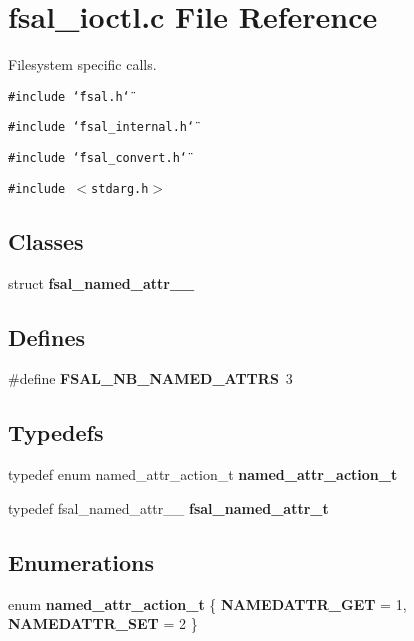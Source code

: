 \section{fsal\_\-ioctl.c File Reference}
\label{fsal__ioctl_8c}
Filesystem specific calls. 

{\tt \#include \char`\"{}fsal.h\char`\"{}}\par
{\tt \#include \char`\"{}fsal\_\-internal.h\char`\"{}}\par
{\tt \#include \char`\"{}fsal\_\-convert.h\char`\"{}}\par
{\tt \#include $<$stdarg.h$>$}\par
\subsection*{Classes}
\begin{CompactItemize}
\item 
struct {\bf fsal\_\-named\_\-attr\_\-\_\-}
\end{CompactItemize}
\subsection*{Defines}
\begin{CompactItemize}
\item 
\#define {\bf FSAL\_\-NB\_\-NAMED\_\-ATTRS}\ 3\label{fsal__ioctl_8c_a0}

\end{CompactItemize}
\subsection*{Typedefs}
\begin{CompactItemize}
\item 
typedef enum named\_\-attr\_\-action\_\-t {\bf named\_\-attr\_\-action\_\-t}\label{fsal__ioctl_8c_a1}

\item 
typedef fsal\_\-named\_\-attr\_\-\_\- {\bf fsal\_\-named\_\-attr\_\-t}\label{fsal__ioctl_8c_a2}

\end{CompactItemize}
\subsection*{Enumerations}
\begin{CompactItemize}
\item 
enum {\bf named\_\-attr\_\-action\_\-t} \{ {\bf NAMEDATTR\_\-GET} =  1, 
{\bf NAMEDATTR\_\-SET} =  2
 \}
\end{CompactItemize}
